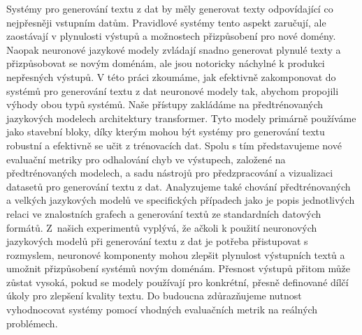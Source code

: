 Systémy pro generování textu z dat by měly generovat texty odpovídající co nejpřesněji vstupním datům. Pravidlové systémy tento aspekt zaručují, ale zaostávají v plynulosti výstupů a možnostech přizpůsobení pro nové domény. Naopak neuronové jazykové modely zvládají snadno generovat plynulé texty a přizpůsobovat se novým doménám, ale jsou notoricky náchylné k produkci nepřesných výstupů. V této práci zkoumáme, jak efektivně zakomponovat do systémů pro generování textu z dat neuronové modely tak, abychom propojili výhody obou typů systémů. Naše přístupy zakládáme na předtrénovaných jazykových modelech architektury transformer. Tyto modely primárně používáme jako stavební bloky, díky kterým mohou být systémy pro generování textu robustní a efektivně se učit z trénovacích dat. Spolu s tím představujeme nové evaluační metriky pro odhalování chyb ve výstupech, založené na předtrénovaných modelech, a sadu nástrojů pro předzpracování a vizualizaci datasetů pro generování textu z dat. Analyzujeme také chování předtrénovaných a velkých jazykových modelů ve specifických případech jako je popis jednotlivých relaci ve znalostních grafech a generování textů ze standardních datových formátů. Z~našich experimentů vyplývá, že ačkoli k použití neuronových jazykových modelů při generování textu z dat je potřeba přistupovat s rozmyslem, neuronové komponenty mohou zlepšit plynulost výstupních textů a umožnit přizpůsobení systémů novým doménám. Přesnost výstupů přitom může zůstat vysoká, pokud se modely používají pro konkrétní, přesně definované dílčí úkoly pro zlepšení kvality textu. Do budoucna zdůrazňujeme nutnost vyhodnocovat systémy pomocí vhodných evaluačních metrik na reálných problémech.